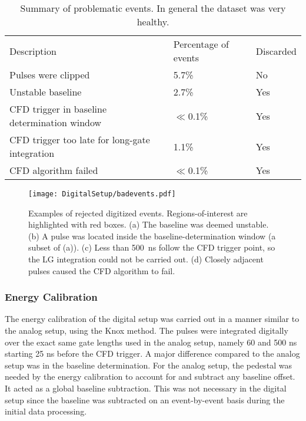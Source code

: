 \documentclass[main.tex]{subfiles}
\begin{document}
\begin{table}[]
\center
\begin{tabular}{|l|l|l|}
\hline
Description                          & Percentage of events & Discarded \\ \hhline{|=|=|=|}
Pulses were clipped                           & 5.7\%                          & No                 \\ \hline
Unstable baseline                             & 2.7\%                        & Yes                \\ \hline
CFD trigger in baseline determination window  & $\ll$0.1\%                      & Yes                \\ \hline
CFD trigger too late for long-gate integration & 1.1\%                         & Yes                \\ \hline
CFD algorithm failed                          & $\ll$0.1\%                    & Yes                \\ \hline

\end{tabular}
\caption[Summary of problematic events.]{Summary of problematic events. In general the dataset was very healthy.}
\label{tab:badevents}
\end{table}

\begin{figure}[ht!]
    \centering
        \texttt{[image: DigitalSetup/badevents.pdf]}
        \caption[Examples of rejected digitized events.]{Examples of rejected digitized events. Regions-of-interest are highlighted with red boxes. (a) The baseline was deemed unstable. (b) A pulse was located inside the baseline-determination window (a subset of (a)). (c) Less than \SI{500}{ns} follow the CFD trigger point, so the LG integration could not be carried out. (d) Closely adjacent pulses caused the CFD algorithm to fail.}
    \label{fig:badevents} 
\end{figure}
\newpage
\subsubsection{Energy Calibration}\label{sec:Ecal_D}
The energy calibration of the digital setup was carried out in a manner similar to the analog setup, using the Knox method. The pulses were integrated digitally over the exact same gate lengths used in the analog setup, namely 60 and 500 ns starting 25 ns before the CFD trigger. A major difference compared to the analog setup was in the baseline determination. For the analog setup, the pedestal was needed by the energy calibration to account for and subtract any baseline offset. It acted as a global baseline subtraction. This was not necessary in the digital setup since the baseline was subtracted on an event-by-event basis during the initial data processing. 
\end{document}
